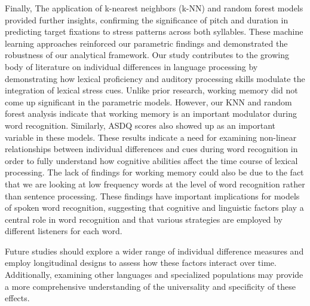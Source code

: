Finally, The application of k-nearest neighbors (k-NN) and random forest models provided further insights, confirming the significance of pitch and duration in predicting target fixations to stress patterns across both syllables. These machine learning approaches reinforced our parametric findings and demonstrated the robustness of our analytical framework. Our study contributes to the growing body of literature on individual differences in language processing by demonstrating how lexical proficiency and auditory processing skills modulate the integration of lexical stress cues. Unlike prior research, working memory did not come up significant in the parametric models. However, our KNN and random forest analysis indicate that working memory is an important modulator during word recognition. Similarly, ASDQ scores also showed up as an important variable in these models. These results indicate a need for examining non-linear relationships between individual differences and cues during word recognition in order to fully understand how cognitive abilities affect the time course of lexical processing. The lack of findings for working memory could also be due to the fact that we are looking at low frequency words at the level of word recognition rather than sentence processing. These findings have important implications for models of spoken word recognition, suggesting that cognitive and linguistic factors play a central role in word recognition and that various strategies are employed by different listeners for each word.

Future studies should explore a wider range of individual difference measures and employ longitudinal designs to assess how these factors interact over time. Additionally, examining other languages and specialized populations may provide a more comprehensive understanding of the universality and specificity of these effects.